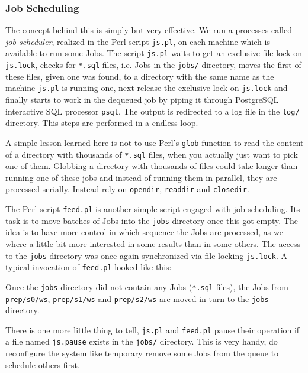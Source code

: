 \subsubsection{Job Scheduling}
\label{sec:jobscheduling}
The concept behind this
is simply but very effective.  We run a processes called \emph{job
scheduler}, realized in the Perl script \texttt{js.pl}, on each
machine which is available to run some Jobs. The script \texttt{js.pl}
waits to get an exclusive file lock on \texttt{js.lock}, checks for
\texttt{*.sql} files, i.e. Jobs in the \texttt{jobs/} directory, moves
the first of these files, given one was found, to a directory with the
same name as the machine \texttt{js.pl} is running one, next release
the exclusive lock on \texttt{js.lock} and finally starts to work in
the dequeued job by piping it through PostgreSQL interactive SQL
processor \texttt{psql}. The output is redirected to a log file in the
\texttt{log/} directory.  This steps are performed in a endless loop.

A simple lesson learned here is not to use Perl's \texttt{glob}
function to read the content of a directory with thousands of
\texttt{*.sql} files, when you actually just want to pick one of
them. Globbing a directory with thousands of files could take longer
than running one of these jobs and instead of running them in
parallel, they are processed serially.  Instead rely on \texttt{opendir},
\texttt{readdir} and \texttt{closedir}.

The Perl script \texttt{feed.pl} is another simple script engaged with
job scheduling.  Its task is to move batches of Jobs into the
\texttt{jobs} directory once this got empty.  The idea is to have
more control in which sequence the Jobs are processed, as we where a
little bit more interested in some results than in some others.  The
access to the \texttt{jobs} directory was once again synchronized via
file locking \texttt{js.lock}.  A typical invocation of
\texttt{feed.pl} looked like this:

\begin{interactive}
\end{interactive}

Once the \texttt{jobs} directory did not contain any Jobs
(\texttt{*.sql}-files), the Jobs from \texttt{prep/s0/ws},
\texttt{prep/s1/ws} and \texttt{prep/s2/ws} are moved in turn to the
\texttt{jobs} directory.

There is one more little thing to tell, \texttt{js.pl} and
\texttt{feed.pl} pause their operation if a file named \texttt{js.pause} exists
in the \texttt{jobs/} directory.  This is very handy, do reconfigure
the system like temporary remove some Jobs from the queue to schedule
others first.

